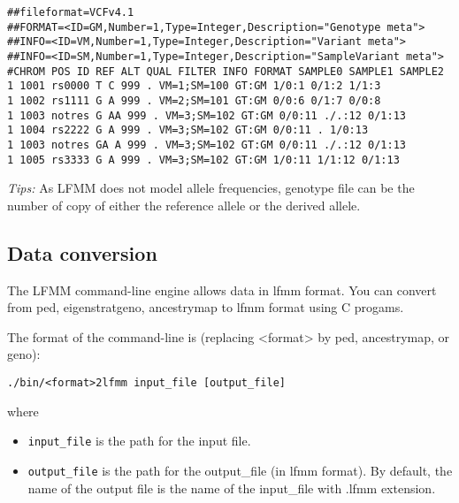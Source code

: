 \documentclass[10pt,a4paper]{article}
\begin{document}
\begin{itemize}
\begin{center}
\begin{Verbatim}[frame=single]
##fileformat=VCFv4.1
##FORMAT=<ID=GM,Number=1,Type=Integer,Description="Genotype meta">
##INFO=<ID=VM,Number=1,Type=Integer,Description="Variant meta">
##INFO=<ID=SM,Number=1,Type=Integer,Description="SampleVariant meta">
#CHROM POS ID REF ALT QUAL FILTER INFO FORMAT SAMPLE0 SAMPLE1 SAMPLE2
1 1001 rs0000 T C 999 . VM=1;SM=100 GT:GM 1/0:1 0/1:2 1/1:3
1 1002 rs1111 G A 999 . VM=2;SM=101 GT:GM 0/0:6 0/1:7 0/0:8
1 1003 notres G AA 999 . VM=3;SM=102 GT:GM 0/0:11 ./.:12 0/1:13
1 1004 rs2222 G A 999 . VM=3;SM=102 GT:GM 0/0:11 . 1/0:13
1 1003 notres GA A 999 . VM=3;SM=102 GT:GM 0/0:11 ./.:12 0/1:13
1 1005 rs3333 G A 999 . VM=3;SM=102 GT:GM 1/0:11 1/1:12 0/1:13
\end{Verbatim}
\end{center}


\end{itemize}
{\it Tips:} As LFMM does not model allele frequencies, genotype file can be
the number of copy of either the reference allele or the derived allele.

\subsection{Data conversion}

The LFMM command-line engine allows data in lfmm format. You can convert from ped, eigenstratgeno,
ancestrymap to lfmm format using C progams. 

The format of the command-line is (replacing <format> by ped, ancestrymap, or geno):
\begin{Verbatim}[frame=single]
./bin/<format>2lfmm input_file [output_file] 
\end{Verbatim}
where
\begin{itemize}
\item \verb|input_file| is the path for the input file.
\item \verb|output_file| is the path for the output\_file (in lfmm format).
By default, the name of the output file is the name of the input\_file with .lfmm extension.
\end{itemize}
\end{document}
